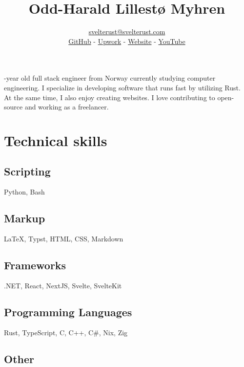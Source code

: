 \documentclass[12pt]{article}
\renewcommand{\maketitle}{
  \begin{center}
    {\huge\bfseries\thetitle}
    
    \vspace{1em}
    
    \theauthor
  \end{center}
}
\begin{document}
\title{Odd-Harald Lillestø Myhren}
\author{\href{mailto:svelterust@svelterust.com}{svelterust@svelterust.com} \\ \vspace{0.5em} \href{https://github.com/knarkzel}{GitHub} - \href{https://www.upwork.com/freelancers/~01a292bc9be02825f6}{Upwork} - \href{https://svelterust.com}{Website} -  \href{https://youtube.com/@svelterust}{YouTube}}

\maketitle

-year old full stack engineer from Norway currently studying computer engineering. I
specialize in developing software that runs fast by utilizing Rust. At the same time, I also
enjoy creating websites. I love contributing to open-source and working as a freelancer.

\section{Technical skills}

\subsection{Scripting}

Python, Bash

\subsection{Markup}

\LaTeX, Typst, HTML, CSS, Markdown

\subsection{Frameworks}

.NET, React, NextJS, Svelte, SvelteKit

\subsection{Programming Languages}

Rust, TypeScript, C, C++, C\#, Nix, Zig

\subsection{Other}
\end{document}
